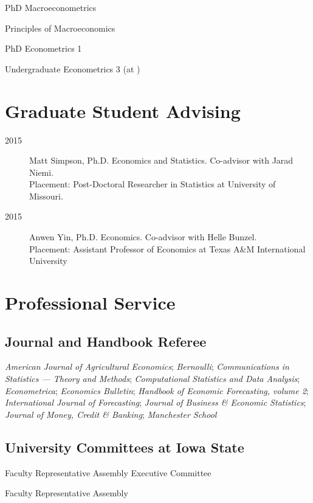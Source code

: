 \documentclass[12pt]{article}%
\newcommand{\allcaps}[1]{\textls{\MakeUppercase{#1}}}
\begin{document}
\begin{description}[noitemsep]
\item[2011 -- present] PhD Macroeconometrics
\item[2010 -- present] Principles of Macroeconomics
\item[2009 -- present] PhD Econometrics 1
\item[2009] Undergraduate Econometrics 3 (at \allcaps{UCSD})
\end{description}

\section*{Graduate Student Advising}
\begin{description}
\item[2015] Matt Simpson, Ph.D. Economics and Statistics.  Co-advisor
with Jarad Niemi. \\
Placement: Post-Doctoral Researcher in Statistics at University of Missouri.
\item[2015] Anwen Yin, Ph.D. Economics. Co-advisor with Helle Bunzel. \\
Placement: Assistant Professor of Economics at Texas A\&M
International University
\end{description}

\section*{Professional Service}

\subsection*{Journal and Handbook Referee}
\textit{American Journal of Agricultural Economics};
\textit{Bernoulli};
\textit{Communications in Statistics --- Theory and Methods};
\textit{Computational Statistics and Data Analysis};
\textit{Econometrica};
\textit{Economics Bulletin};
\textit{Handbook of Economic Forecasting, volume 2};
\textit{International Journal of Forecasting};
\textit{Journal of Business \& Economic Statistics};
\textit{Journal of Money, Credit \& Banking};
\textit{Manchester School}

\subsection*{University Committees at Iowa State}

\begin{description}[noitemsep]
\item[2014 -- present] Faculty Representative Assembly Executive
Committee
\item[2013 -- present] Faculty Representative Assembly
\end{description}
\end{document}
